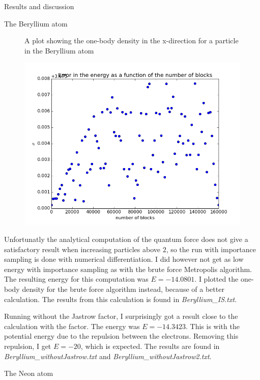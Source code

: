 \documentclass[a4paper, 12pt, titlepage]{article}
\begin{document}
\begin{section}{Results and discussion}
\begin{subsection}{The Beryllium atom}
\begin{figure}
 	\caption{A plot showing the one-body density in the x-direction for a particle in the Beryllium atom}
 \end{figure}
 \begin{figure}
 	\centering
 	\includegraphics[width=\textwidth]{../python_programs/BerylliumBlocking.png}
 \end{figure}


 Unfortunatly the analytical computation of the quantum force does not give a satisfactory result when increasing particles above $2$, so the run with importance sampling is done with numerical differentiation. I did however not get as low energy with importance sampling as with the brute force Metropolis algorithm. The resulting energy for this computation was $E = -14.0801$. I plotted the one-body density for the brute force algorithm instead, because of a better calculation. The results from this calculation is found in \textit{Beryllium\_IS.txt}. 

 Running without the Jastrow factor, I surprisingly got a result close to the calculation with the factor. The energy was $E = -14.3423$. This is with the potential energy due to the repulsion between the electrons. Removing this repulsion, I get $E = -20$, which is expected. The results are found in \textit{Beryllium\_withoutJastrow.txt} and \textit{Beryllium\_withoutJastrow2.txt}. 
 \end{subsection}

 \begin{subsection}{The Neon atom}
 	
 \end{subsection}


\end{section}
\end{document}
